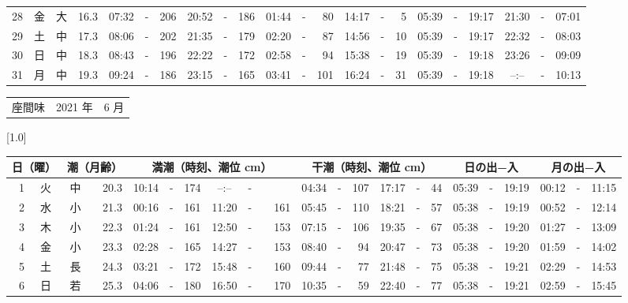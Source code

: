 \documentclass[12pt,a4j]{jsarticle}
\begin{document}
\begin{table}[htbp]
\begin{center}
{\begin{tabular}{|rc|cr|ccrccr|ccrccr|ccc|ccc|}
28 & 金 & 大 & 16.3 &  07:32 &-& 206 &  20:52 &-& 186 &  01:44 &-&  80 &  14:17 &-&   5 & 05:39 & -& 19:17 & 21:30 & -& 07:01 \\
29 & 土 & 中 & 17.3 &  08:06 &-& 202 &  21:35 &-& 179 &  02:20 &-&  87 &  14:56 &-&  10 & 05:39 & -& 19:17 & 22:32 & -& 08:03 \\
30 & 日 & 中 & 18.3 &  08:43 &-& 196 &  22:22 &-& 172 &  02:58 &-&  94 &  15:38 &-&  19 & 05:39 & -& 19:18 & 23:26 & -& 09:09 \\
31 & 月 & 中 & 19.3 &  09:24 &-& 186 &  23:15 &-& 165 &  03:41 &-& 101 &  16:24 &-&  31 & 05:39 & -& 19:18 & --:-- & -& 10:13 \\
   \hline
   \end{tabular}}
   \end{center}
\end{table}
\newpage
 \begin{table}[htbp]
 \begin{center}
 \begin{tabular}{lcc}
 \LARGE{座間味}  & \large{2021 年} & \large{ 6 月} \\
 \end{tabular}
 \end{center}
 \begin{center}
    \scalebox{0.7}[1.0]{
    \begin{tabular}{|rc|cr|ccrccr|ccrccr|ccc|ccc|}
    \hline
    \multicolumn{2}{|c|}{日（曜）} & \multicolumn{2}{c|}{潮（月齢）} & \multicolumn{6}{c|}{満潮（時刻、潮位 cm）} & \multicolumn{6}{c|}{干潮（時刻、潮位 cm）} & \multicolumn{3}{c|}{日の出−入} &  \multicolumn{3}{c|}{月の出−入}\\
 \hline
 1 & 火 & 中 & 20.3 &  10:14 &-& 174 &  --:-- &-&~~~~~ &  04:34 &-& 107 &  17:17 &-&  44 & 05:39 & -& 19:19 & 00:12 & -& 11:15 \\
 2 & 水 & 小 & 21.3 &  00:16 &-& 161 &  11:20 &-& 161 &  05:45 &-& 110 &  18:21 &-&  57 & 05:38 & -& 19:19 & 00:52 & -& 12:14 \\
 3 & 木 & 小 & 22.3 &  01:24 &-& 161 &  12:50 &-& 153 &  07:15 &-& 106 &  19:35 &-&  67 & 05:38 & -& 19:20 & 01:27 & -& 13:09 \\
 4 & 金 & 小 & 23.3 &  02:28 &-& 165 &  14:27 &-& 153 &  08:40 &-&  94 &  20:47 &-&  73 & 05:38 & -& 19:20 & 01:59 & -& 14:02 \\
 5 & 土 & 長 & 24.3 &  03:21 &-& 172 &  15:48 &-& 160 &  09:44 &-&  77 &  21:48 &-&  75 & 05:38 & -& 19:21 & 02:29 & -& 14:53 \\
 6 & 日 & 若 & 25.3 &  04:06 &-& 180 &  16:50 &-& 170 &  10:35 &-&  59 &  22:40 &-&  77 & 05:38 & -& 19:21 & 02:59 & -& 15:45 \\

\end{tabular}}
\end{center}
\end{table}
\end{document}

